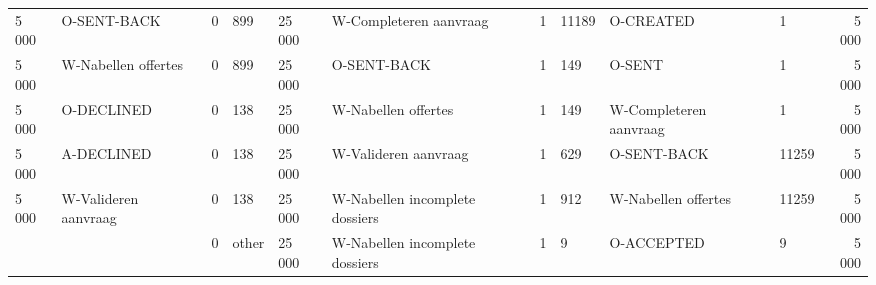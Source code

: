 \begin{tabular}{llllllllllr}
5 000 & O-SENT-BACK & 0 & 899 & 25 000 & W-Completeren aanvraag & 1 & 11189 & O-CREATED & 1 & 5 000 \\
5 000 & W-Nabellen offertes & 0 & 899 & 25 000 & O-SENT-BACK & 1 & 149 & O-SENT & 1 & 5 000 \\
5 000 & O-DECLINED & 0 & 138 & 25 000 & W-Nabellen offertes & 1 & 149 & W-Completeren aanvraag & 1 & 5 000 \\
5 000 & A-DECLINED & 0 & 138 & 25 000 & W-Valideren aanvraag & 1 & 629 & O-SENT-BACK & 11259 & 5 000 \\
5 000 & W-Valideren aanvraag & 0 & 138 & 25 000 & W-Nabellen incomplete dossiers & 1 & 912 & W-Nabellen offertes & 11259 & 5 000 \\
 &  & 0 & other & 25 000 & W-Nabellen incomplete dossiers & 1 & 9 & O-ACCEPTED & 9 & 5 000 \\
\bottomrule
\end{tabular}
